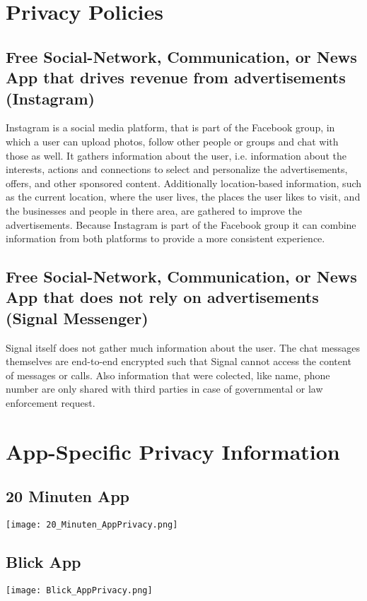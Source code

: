 \documentclass{report}
\begin{document}
	\pagestyle{fancy}
	
	\section{Privacy Policies}
	\startsection
		\subsection{Free Social-Network, Communication, or News App that drives revenue from advertisements (Instagram) \cite{InstagramPP}}
		\startsubsection
			Instagram is a social media platform, that is part of the Facebook group, in which a user can upload photos, follow other people or groups and chat with those as well. It gathers information about the user, i.e. information about the interests, actions and connections to select and personalize the advertisements, offers, and other sponsored content. Additionally location-based information, such as the current location, where the user lives, the places the user likes to visit, and the businesses and people in there area, are gathered to improve the advertisements. Because Instagram is part of the Facebook group it can combine information from both platforms to provide a more consistent experience.
		\closesection
		\subsection{Free Social-Network, Communication, or News App that does not rely on advertisements (Signal Messenger) \cite{SignalPP}}
		\startsubsection
			Signal itself does not gather much information about the user. The chat messages themselves are end-to-end encrypted such that Signal cannot access the content of messages or calls. Also information that were colected, like name, phone number are only shared with third parties in case of governmental or law enforcement request.
		\closesection
	\closesection
	
	\section{App-Specific Privacy Information}
	\startsection
		\subsection{20 Minuten App \cite{20MinutenAppStore}}
		\startsubsection
			\texttt{[image: 20\_Minuten\_AppPrivacy.png]}
		\closesection
		\subsection{Blick App \cite{BlickAppStore}}
		\startsubsection
			\texttt{[image: Blick\_AppPrivacy.png]}
		\closesection
\end{document}
